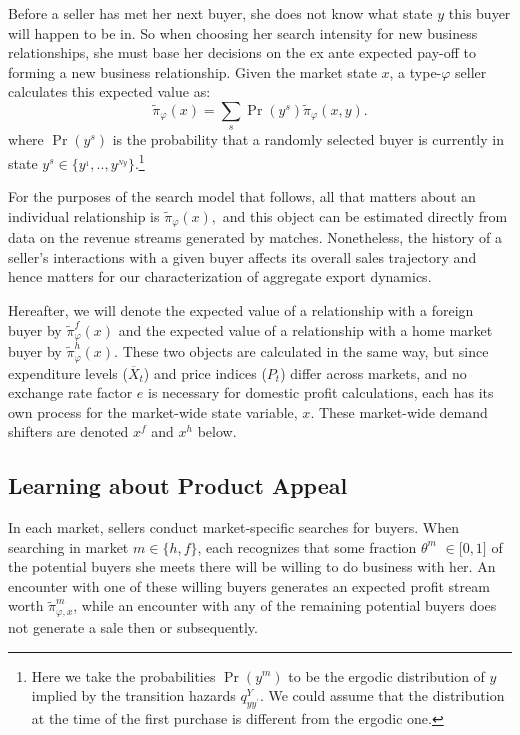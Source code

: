 \documentclass[12pt]{article}
\begin{document}
Before a seller has met her next buyer, she does not know what state $y$
this buyer will happen to be in. So when choosing her search intensity for
new business relationships, she must base her decisions on the ex ante
expected pay-off to forming a new business relationship. Given the market
state $x$, a type-$\varphi $ seller calculates this expected value as:%
\begin{equation*}
\widetilde{\pi }_{\varphi }(x)=\sum_{s}\Pr (y^{s})\widetilde{\pi }_{\varphi
}(x,y).
\end{equation*}%
where $\Pr (y^{s})$ is the probability that a randomly selected buyer is
currently in state $y^{s}\in \{y^{_{1}},..,y^{_{Ny}}\}$.\footnote{%
Here we take the probabilities $\Pr (y^{m})$ to be the ergodic distribution
of $y$ implied by the transition hazards $q_{yy^{\prime }}^{Y}.$ We could
assume that the distribution at the time of the first purchase is different
from the ergodic one.\medskip}

For the purposes of the search model that follows, all that matters about an
individual relationship is $\widetilde{\pi }_{\varphi }(x),$ and this object
can be estimated directly from data on the revenue streams generated by
matches. Nonetheless, the history of a seller's interactions with a given
buyer affects its overall sales trajectory and hence matters for our
characterization of aggregate export dynamics.

Hereafter, we will denote the expected value of a relationship with a
foreign buyer by $\widetilde{\pi }_{\varphi }^{f}(x)$ and the expected value
of a relationship with a home market buyer by $\widetilde{\pi }_{\varphi
}^{h}(x).$ These two objects are calculated in the same way, but since
expenditure levels ($\overline{X}_{t}$) and price indices ($P_{t}$) differ
across markets, and no exchange rate factor $e$ is necessary for domestic
profit calculations, each has its own process for the market-wide state
variable, $x.$ These market-wide demand shifters are denoted $x^{f}$ and $%
x^{h}$ below$.$

\subsection{Learning about Product Appeal}

In each market, sellers conduct market-specific searches for buyers. When
searching in market $m\in \{h,f\}$, each recognizes that some fraction $%
\theta ^{m}$ $\in \lbrack 0,1]$ of the potential buyers she meets there will
be willing to do business with her. An encounter with one of these willing
buyers generates an expected profit stream worth $\widetilde{\pi }_{\varphi
,x}^{m}$, while an encounter with any of the remaining potential buyers does
not generate a sale then or subsequently.
\end{document}
